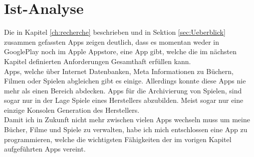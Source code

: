 \chapter{Ist-Analyse}

Die in Kapitel \ref{ch:recherche} beschrieben und in Sektion \ref{sec:Ueberblick} zusammen gefassten Apps zeigen deutlich, dass es momentan weder in GooglePlay noch im Apple Appstore, eine App gibt, welche die im nächsten Kapitel definierten Anforderungen Gesamthaft erfüllen kann.\\

Apps, welche über Internet Datenbanken, Meta Informationen zu Büchern, Filmen oder Spielen abgleichen gibt es einige. Allerdings konnte diese Apps nie mehr als einen Bereich abdecken. Apps für die Archivierung von Spielen, sind sogar nur in der Lage Spiele eines Herstellers abzubilden. Meist sogar nur eine einzige Konsolen Generation des Herstellers.\\

Damit ich in Zukunft nicht mehr zwischen vielen Apps wechseln muss um meine Bücher, Filme und Spiele zu verwalten, habe ich mich entschlossen eine App zu programmieren, welche die wichtigsten Fähigkeiten der im vorigen Kapitel aufgeführten Apps vereint.
